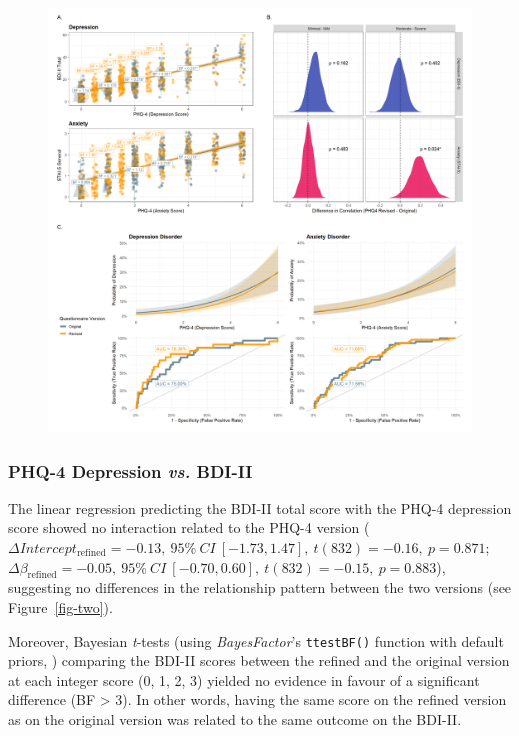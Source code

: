 \documentclass[
  jou,
  floatsintext,
  longtable,
  nolmodern,
  notxfonts,
  notimes,
  colorlinks=true,linkcolor=blue,citecolor=blue,urlcolor=blue]{apa7}
\begin{document}
\begin{figure}[!htbp]
\includegraphics[width=1\textwidth,height=\textheight]{../../study2/analysis/2_analysis_files/figure-html/figure-1.png}

\end{figure}

\subsubsection{\texorpdfstring{PHQ-4 Depression \emph{vs.}
BDI-II}{PHQ-4 Depression vs. BDI-II}}\label{phq-4-depression-vs.-bdi-ii}

The linear regression predicting the BDI-II total score with the PHQ-4
depression score showed no interaction related to the PHQ-4 version
(\(\Delta Intercept_{\text{refined}} =  -0.13,~95\%~CI~[-1.73, 1.47],~t(832) =  -0.16,~p = 0.871\);
\(\Delta \beta_{\text{refined}} = -0.05,~95\%~CI~[-0.70, 0.60],~t(832) = -0.15,~p = 0.883\)),
suggesting no differences in the relationship pattern between the two
versions (see Figure~\ref{fig-two}).

Moreover, Bayesian \emph{t}-tests (using \emph{BayesFactor}'s
\texttt{ttestBF()} function with default priors,
) comparing the
BDI-II scores between the refined and the original version at each
integer score (0, 1, 2, 3) yielded no evidence in favour of a
significant difference (BF \textgreater{} 3). In other words, having the
same score on the refined version as on the original version was related
to the same outcome on the BDI-II.
\end{document}
